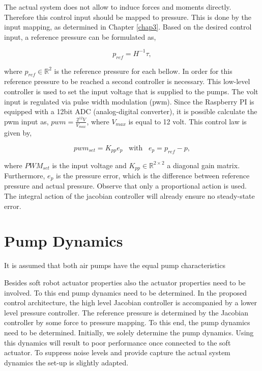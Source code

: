 The actual system does not allow to induce forces and moments directly. Therefore this control input should be mapped to pressure. This is done by the input mapping, as determined in Chapter \ref{chap3}. Based on the desired control input, a reference pressure can be formulated as,

\begin{equation}
    p_{ref} = H^{-1}\tau,
\end{equation}


where $p_{ref} \in \mathbb{R}^2$ is the reference pressure for each bellow. In order for this reference pressure to be reached a second controller is necessary. This low-level controller is used to set the input voltage that is supplied to the pumps.  The volt input is regulated via pulse width modulation (pwm). Since the Raspberry PI is equipped with a 12bit ADC (analog-digital converter), it is possible calculate the pwm input as, $\textit{pwm} = \frac{2^{12} V}{V_{max}} $, where $V_{max}$ is equal to 12 volt. This control law is given by,


\begin{equation}
    pwm_{set} = K_{pp}e_p \hspace{10pt} \text{with} \hspace{10pt} e_p = p_{ref} - p,
\end{equation}



where $PWM_{set}$ is the input voltage and $K_{pp} \in \mathbb{R}^{2\times 2}$ a diagonal gain matrix. Furthermore, $e_p$ is the pressure error, which is the difference between reference pressure and actual pressure. Observe that only a proportional action is used. The integral action of the jacobian controller will already ensure no steady-state error.


\section{Pump Dynamics}


\begin{theorem}
It is assumed that both air pumps have the equal pump characteristics
\end{theorem}


Besides soft robot actuator properties also the actuator properties need to be involved. To this end pump dynamics need to be determined. In the proposed control architecture, the high level Jacobian controller is accompanied by a lower level pressure controller. The reference pressure is determined by the Jacobian controller by some force to pressure mapping. To this end, the pump dynamics need to be determined. Initially, we solely determine the pump dynamics. Using this dynamics will result to poor performance once connected to the soft actuator. To suppress noise levels and provide capture the actual system dynamics the set-up is slightly adapted.


